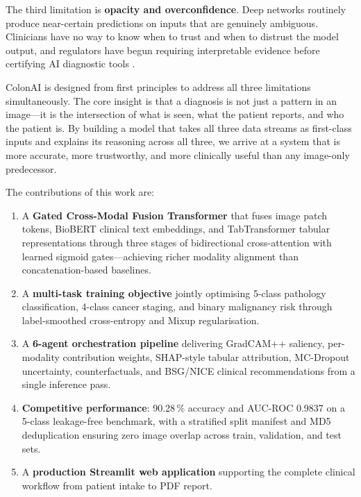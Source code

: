 \documentclass[conference]{IEEEtran}
\begin{document}
The third limitation is \textbf{opacity and overconfidence}. Deep networks
routinely produce near-certain predictions on inputs that are genuinely
ambiguous. Clinicians have no way to know when to trust and when to distrust
the model output, and regulators have begun requiring interpretable evidence
before certifying AI diagnostic tools \cite{ghassemi2021}.

ColonAI is designed from first principles to address all three limitations
simultaneously. The core insight is that a diagnosis is not just a pattern in
an image---it is the intersection of what is seen, what the patient reports,
and who the patient is. By building a model that takes all three data streams
as first-class inputs and explains its reasoning across all three, we arrive
at a system that is more accurate, more trustworthy, and more clinically useful
than any image-only predecessor.

The contributions of this work are:
\begin{enumerate}
  \item A \textbf{Gated Cross-Modal Fusion Transformer} that fuses image patch
        tokens, BioBERT clinical text embeddings, and TabTransformer tabular
        representations through three stages of bidirectional cross-attention
        with learned sigmoid gates---achieving richer modality alignment than
        concatenation-based baselines.
  \item A \textbf{multi-task training objective} jointly optimising 5-class
        pathology classification, 4-class cancer staging, and binary malignancy
        risk through label-smoothed cross-entropy and Mixup regularisation.
  \item A \textbf{6-agent orchestration pipeline} delivering GradCAM++
        saliency, per-modality contribution weights, SHAP-style tabular
        attribution, MC-Dropout uncertainty, counterfactuals, and BSG/NICE
        clinical recommendations from a single inference pass.
  \item \textbf{Competitive performance}: 90.28\,\% accuracy and
        AUC-ROC 0.9837 on a 5-class leakage-free benchmark, with a
        stratified split manifest and MD5 deduplication ensuring zero
        image overlap across train, validation, and test sets.
  \item A \textbf{production Streamlit web application} supporting the
        complete clinical workflow from patient intake to PDF report.
\end{enumerate}
\end{document}
